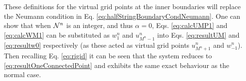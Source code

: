 These definitions for the virtual grid points at the inner boundaries will replace the Neumann condition in Eq. \eqref{eq:halfStringBoundaryCondNeumann}. %
One can show that when $\mathcal{N}^n$ is an integer, and thus $\alpha = 0$, Eqs. \eqref{eq:calcUMP1} and \eqref{eq:calcWM1} can be substituted as $w_1^n$ and $u_{M^n-1}^n$ into Eqs. \eqref{eq:resultUM} and \eqref{eq:resultw0} respectively (as these acted as virtual grid points $u_{M^n+1}^n$ and $w_{-1}^n$). Then recalling Eq. \eqref{eq:rigid} it can be seen that the system reduces to \eqref{eq:resultOneConnectedPoint} and exhibits the same exact behaviour as the normal case. %

